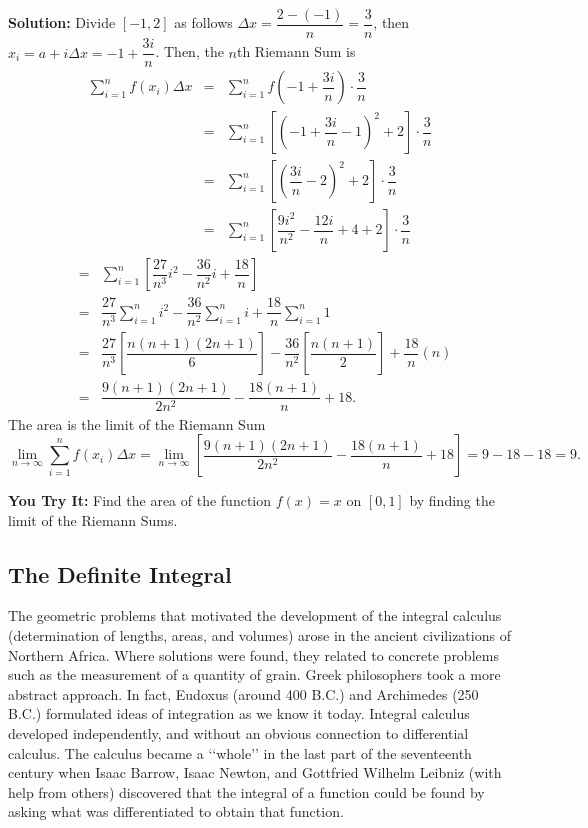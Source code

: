 \documentclass[titlepage,a4paper,12pt]{report}
\begin{document}
\noindent \textbf{Solution:} Divide $[-1,2]$ as follows $\Delta x =\dfrac{2-(-1)}{n}=\dfrac{3}{n}$, then $x_i=a+i\Delta x =-1+\dfrac{3i}{n}$. Then,  the $n$th Riemann Sum is \\
\begin{eqnarray*}
\sum _{i=1}^n f(x_i)\Delta x &=&\sum _{i=1}^n f\left(-1+\dfrac{3i}{n}\right) \cdot \dfrac{3}{n} \\
&=& \sum _{i=1}^n \left[\left(-1+\dfrac{3i}{n}-1\right)^2+2\right]\cdot \dfrac{3}{n} \\
&=& \sum _{i=1}^n  \left[\left(\dfrac{3i}{n}-2\right)^2+2\right]\cdot \dfrac{3}{n} \\
&=& \sum _{i=1}^n \left[\dfrac{9i^2}{n^2}-\dfrac{12i}{n}+4+2\right] \cdot \dfrac{3}{n} 
\end{eqnarray*}
\begin{eqnarray*}
&=& \sum _{i=1}^n \left[\dfrac{27}{n^3}i^2-\dfrac{36}{n^2}i+\dfrac{18}{n}\right]\\
&=& \dfrac{27}{n^3}\sum _{i=1}^n i^2-\dfrac{36}{n^2}\sum _{i=1}^n i+\dfrac{18}{n}\sum _{i=1}^n 1\\
&=& \dfrac{27}{n^3} \left[\dfrac{n(n+1)(2n+1)}{6}\right]-\dfrac{36}{n^2}\left[\dfrac{n(n+1)}{2}\right]+\dfrac{18}{n}(n)\\
&=&\dfrac{9(n+1)(2n+1)}{2n^2}-\dfrac{18(n+1)}{n}+18.
\end{eqnarray*}
The area is the limit of the Riemann Sum 
\begin{equation*}
\lim _{n\rightarrow \infty} \sum _{i=1}^n f(x_i)\Delta x =\lim _{n\rightarrow \infty} \left[ \dfrac{9(n+1)(2n+1)}{2n^2}-\dfrac{18(n+1)}{n}+18\right] =9-18-18 =9.
\end{equation*}

\noindent \textbf{You Try It:} Find the area of the function $f(x)=x$ on $[0,1]$ by finding the limit of the Riemann Sums.
\subsection{The Definite Integral}
The geometric problems that motivated the development of the integral calculus (determination of
lengths, areas, and volumes) arose in the ancient civilizations of Northern Africa. Where solutions were
found, they related to concrete problems such as the measurement of a quantity of grain. Greek
philosophers took a more abstract approach. In fact, Eudoxus (around 400 B.C.) and Archimedes
(250 B.C.) formulated ideas of integration as we know it today.
Integral calculus developed independently, and without an obvious connection to differential
calculus. The calculus became a ‘‘whole’’ in the last part of the seventeenth century when Isaac Barrow,
Isaac Newton, and Gottfried Wilhelm Leibniz (with help from others) discovered that the integral of a
function could be found by asking what was differentiated to obtain that function.
\end{document}
